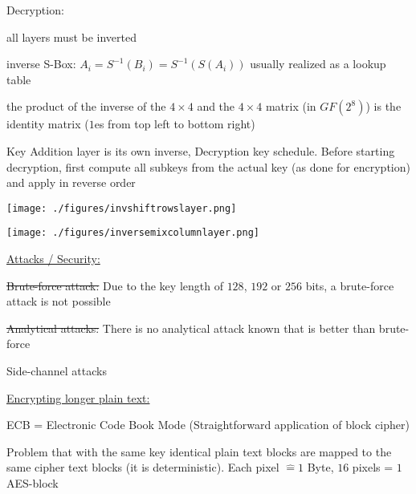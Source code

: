 \documentclass[landscape, a4paper]{article}
\begin{document}
\begin{minipage}[t]{0.198\pagewidth}
	\begin{betterlist}
		\item \alert{Decryption:}
		\begin{betterlist}
			\item all layers must be inverted
			\item inverse S-Box: $A_i = S^{-1}(B_i) = S^{-1}(S(A_i))$ usually realized as a lookup table
			\item the product of the inverse of the $4\times 4$ and the $4\times 4$ matrix (in $GF(2^8)$) is the identity matrix ($1$es from top left to bottom right)
			\item Key Addition layer is its own inverse, Decryption key schedule. Before starting decryption, first compute all subkeys from the
			actual key (as done for encryption) and apply in reverse order
		\end{betterlist}
		\begin{minipage}[b]{0.5\linewidth}
			\texttt{[image: ./figures/invshiftrowslayer.png]}
		\end{minipage}
		\begin{minipage}[b]{0.5\linewidth}
			\texttt{[image: ./figures/inversemixcolumnlayer.png]}
		\end{minipage}
		\item \underline{Attacks / Security:}
		\begin{betterlist}
			\item \sout{Brute-force attack:} Due to the key length of $128$, $192$ or $256$ bits, a brute-force attack is not possible
			\item \sout{Analytical attacks:} There is no analytical attack known that is better than brute-force
			\item Side-channel attacks
		\end{betterlist}
	\end{betterlist}
	\begin{betterlist}
		\item \underline{Encrypting longer plain text:}
		\begin{betterlist}
			\item \alert{ECB} = Electronic Code Book Mode (Straightforward application of block cipher)
			\begin{betterlist}
				\item Problem that with the same key identical plain text blocks are mapped to the same cipher text blocks (it is deterministic). Each pixel $\hat= 1$ Byte, $16$ pixels = $1$ AES-block

\end{betterlist}
\end{betterlist}
\end{betterlist}
\end{minipage}
\end{document}

